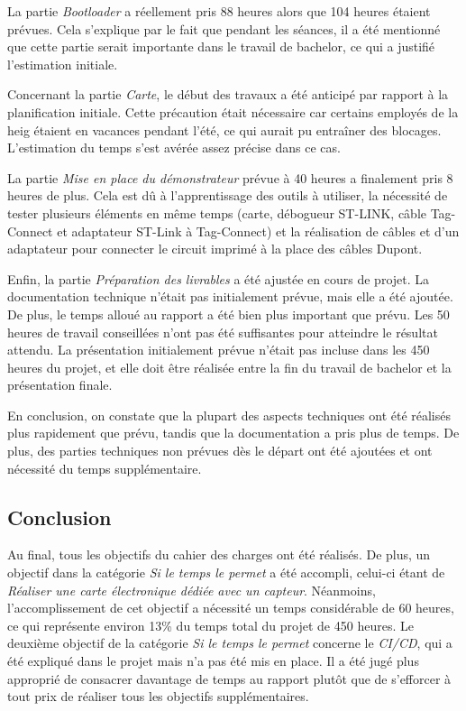 La partie \textit{Bootloader} a réellement pris 88 heures alors que 104 heures étaient prévues.
Cela s'explique par le fait que pendant les séances, il a été mentionné que cette partie serait importante dans le travail de bachelor, ce qui a justifié l'estimation initiale.

Concernant la partie \textit{Carte}, le début des travaux a été anticipé par rapport à la planification initiale.
Cette précaution était nécessaire car certains employés de la \gls{heig} étaient en vacances pendant l'été, ce qui aurait pu entraîner des blocages.
L'estimation du temps s'est avérée assez précise dans ce cas.

La partie \textit{Mise en place du démonstrateur} prévue à 40 heures a finalement pris 8 heures de plus.
Cela est dû à l'apprentissage des outils à utiliser, la nécessité de tester plusieurs éléments en même temps (carte, débogueur ST-LINK, câble Tag-Connect et adaptateur ST-Link à Tag-Connect) et la réalisation de câbles et d'un adaptateur pour connecter le circuit imprimé à la place des câbles Dupont.

Enfin, la partie \textit{Préparation des livrables} a été ajustée en cours de projet.
La documentation technique n'était pas initialement prévue, mais elle a été ajoutée.
De plus, le temps alloué au rapport a été bien plus important que prévu.
Les 50 heures de travail conseillées n'ont pas été suffisantes pour atteindre le résultat attendu.
La présentation initialement prévue n'était pas incluse dans les 450 heures du projet, et elle doit être réalisée entre la fin du travail de bachelor et la présentation finale.

En conclusion, on constate que la plupart des aspects techniques ont été réalisés plus rapidement que prévu, tandis que la documentation a pris plus de temps. De plus, des parties techniques non prévues dès le départ ont été ajoutées et ont nécessité du temps supplémentaire.

\subsection{Conclusion}

Au final, tous les objectifs du cahier des charges ont été réalisés.
De plus, un objectif dans la catégorie \textit{Si le temps le permet} a été accompli, celui-ci étant de \textit{Réaliser une carte électronique dédiée avec un capteur}.
Néanmoins, l'accomplissement de cet objectif a nécessité un temps considérable de 60 heures, ce qui représente environ 13\% du temps total du projet de 450 heures.
Le deuxième objectif de la catégorie \textit{Si le temps le permet} concerne le \textit{CI/CD}, qui a été expliqué dans le projet mais n'a pas été mis en place.
Il a été jugé plus approprié de consacrer davantage de temps au rapport plutôt que de s'efforcer à tout prix de réaliser tous les objectifs supplémentaires.